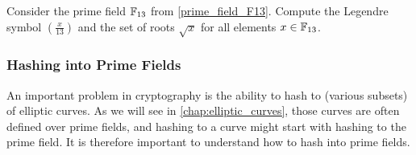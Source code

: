 \begin{exercise}
Consider the prime field $\mathbb{F}_{13}$ from \exercisename{} \ref{prime_field_F13}. Compute the Legendre symbol $\left(\frac{x}{13} \right)$ and the set of roots $\sqrt{x}$ for all elements $x\in \mathbb{F}_{13}$. 
\end{exercise}
%

\subsubsection{Hashing into Prime Fields}\label{hashing-prime-fields}
An important problem in cryptography is the ability to hash to (various subsets) of elliptic curves. As we will see in \chaptname{} \ref{chap:elliptic_curves}, those curves are often defined over prime fields, and hashing to a curve might start with hashing to the prime field. It is therefore important to understand how to hash into prime fields.

